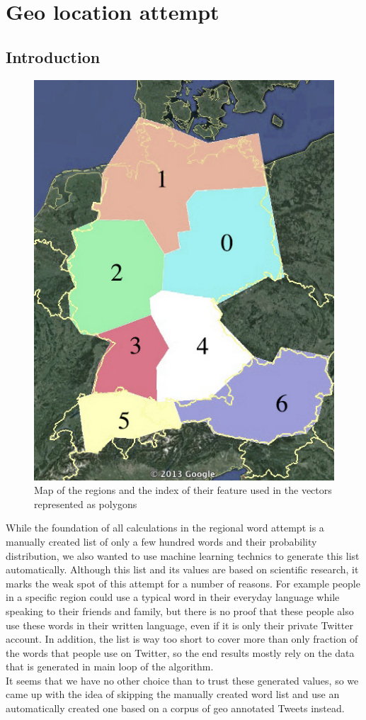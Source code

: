 \documentclass[../Main.tex]{subfiles}
\begin{document}
\section{Geo location attempt }
\subsection{Introduction}
\begin{figure}
  \begin{center}
   \includegraphics[width=0.5\columnwidth]{../img/polygone_satt.jpg}
    \caption{\label{geo_polymap} Map of the regions and the index of their feature used in the vectors represented as polygons}
  \end{center}
\end{figure}
While the foundation of all calculations in the regional word attempt is a manually created list of only a few hundred words and their probability distribution, we also wanted to use machine learning technics to generate this list automatically.
Although this list and its values are based on scientific research, it marks the weak spot of this attempt for a number of reasons. For example people in a specific region could use a typical word in their everyday language while speaking to their friends and family, but there is no proof that these people also use these words in their written language, even if it is only their private Twitter account. In addition, the list is way too short to cover more than only fraction of the words that people use on Twitter, so the end results mostly rely on the data that is generated in main loop of the algorithm. \\
It seems that we have no other choice than to trust these generated values, so we came up with the idea of skipping the manually created word list and use an automatically created one based on a corpus of geo annotated Tweets instead. 
\end{document}
